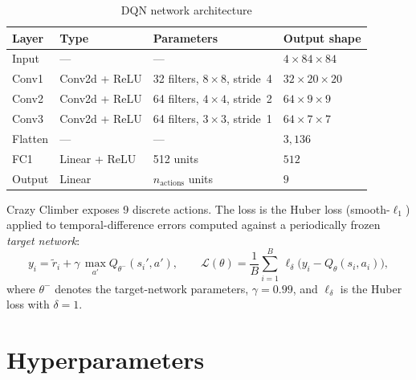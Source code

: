 \documentclass[11pt,a4paper]{article}
\begin{document}
\begin{table}[H]
\centering
\caption{DQN network architecture}
\begin{tabular}{llll}
\toprule
Layer   & Type           & Parameters                          & Output shape \\
\midrule
Input   & ---            & ---                                 & $4\times84\times84$ \\
Conv1   & Conv2d + ReLU  & 32 filters, $8\times8$, stride~4    & $32\times20\times20$ \\
Conv2   & Conv2d + ReLU  & 64 filters, $4\times4$, stride~2    & $64\times9\times9$ \\
Conv3   & Conv2d + ReLU  & 64 filters, $3\times3$, stride~1    & $64\times7\times7$ \\
Flatten & ---            & ---                                 & $3{,}136$ \\
FC1     & Linear + ReLU  & 512 units                           & $512$ \\
Output  & Linear         & $n_\text{actions}$ units            & $9$ \\
\bottomrule
\end{tabular}
\end{table}

Crazy Climber exposes 9 discrete actions.
The loss is the Huber loss (smooth-$\ell_1$) applied to temporal-difference
errors computed against a periodically frozen \emph{target network}:
\begin{equation}
  y_i = \tilde{r}_i + \gamma\,\max_{a'} Q_{\theta^{-}}(s_i', a'),
  \qquad
  \mathcal{L}(\theta) =
    \frac{1}{B}\sum_{i=1}^{B}\,\ell_\delta\!\bigl(y_i - Q_\theta(s_i,a_i)\bigr),
\end{equation}
where $\theta^{-}$ denotes the target-network parameters, $\gamma=0.99$,
and $\ell_\delta$ is the Huber loss with $\delta=1$.

\section{Hyperparameters}
\end{document}
